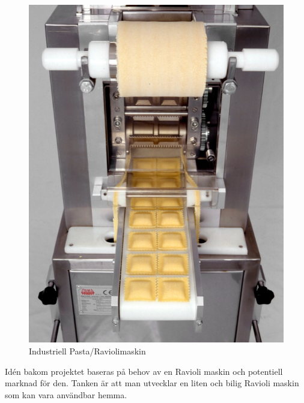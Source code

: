  		\begin{figure}[h]
 			\begin{center}
 				\includegraphics[scale=2]{images/pastamachine.jpg}
 				\caption{Industriell Pasta/Raviolimaskin}
 				\label{pastamaskin}	
 			\end{center}
 		\end{figure}

Idén bakom projektet baseras på behov av en Ravioli maskin och potentiell marknad för den. Tanken är att man utvecklar en liten och bilig Ravioli maskin som kan vara användbar hemma.		